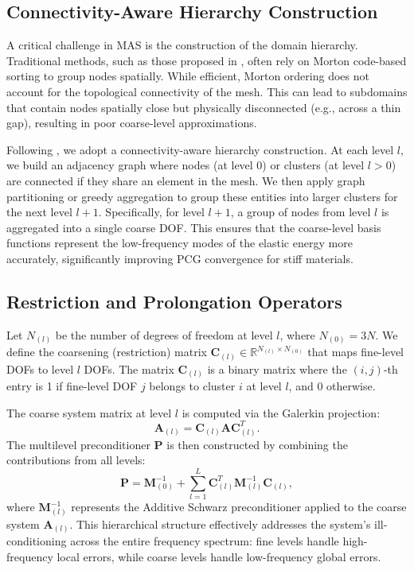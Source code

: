 \documentclass[acmtog,anonymous,review,screen,nonacm]{acmart}
\begin{document}
\subsection{Connectivity-Aware Hierarchy Construction}
A critical challenge in MAS is the construction of the domain hierarchy. Traditional methods, such as those proposed in \cite{wu2022gpu}, often rely on Morton code-based sorting to group nodes spatially. While efficient, Morton ordering does not account for the topological connectivity of the mesh. This can lead to subdomains that contain nodes spatially close but physically disconnected (e.g., across a thin gap), resulting in poor coarse-level approximations.

Following \cite{huang2025stiffgipc}, we adopt a connectivity-aware hierarchy construction. At each level $l$, we build an adjacency graph where nodes (at level 0) or clusters (at level $l>0$) are connected if they share an element in the mesh. We then apply graph partitioning or greedy aggregation to group these entities into larger clusters for the next level $l+1$. Specifically, for level $l+1$, a group of nodes from level $l$ is aggregated into a single coarse DOF. This ensures that the coarse-level basis functions represent the low-frequency modes of the elastic energy more accurately, significantly improving PCG convergence for stiff materials.

\subsection{Restriction and Prolongation Operators}
Let $N_{(l)}$ be the number of degrees of freedom at level $l$, where $N_{(0)} = 3N$. We define the coarsening (restriction) matrix $\mathbf{C}_{(l)} \in \mathbb{R}^{N_{(l)} \times N_{(0)}}$ that maps fine-level DOFs to level $l$ DOFs. The matrix $\mathbf{C}_{(l)}$ is a binary matrix where the $(i, j)$-th entry is 1 if fine-level DOF $j$ belongs to cluster $i$ at level $l$, and 0 otherwise.

The coarse system matrix at level $l$ is computed via the Galerkin projection:
\begin{equation}
    \mathbf{A}_{(l)} = \mathbf{C}_{(l)} \mathbf{A} \mathbf{C}_{(l)}^T.
\end{equation}
The multilevel preconditioner $\mathbf{P}$ is then constructed by combining the contributions from all levels:
\begin{equation}
    \mathbf{P} = \mathbf{M}_{(0)}^{-1} + \sum_{l=1}^L \mathbf{C}_{(l)}^T \mathbf{M}_{(l)}^{-1} \mathbf{C}_{(l)},
\end{equation}
where $\mathbf{M}_{(l)}^{-1}$ represents the Additive Schwarz preconditioner applied to the coarse system $\mathbf{A}_{(l)}$. This hierarchical structure effectively addresses the system's ill-conditioning across the entire frequency spectrum: fine levels handle high-frequency local errors, while coarse levels handle low-frequency global errors.
\end{document}
